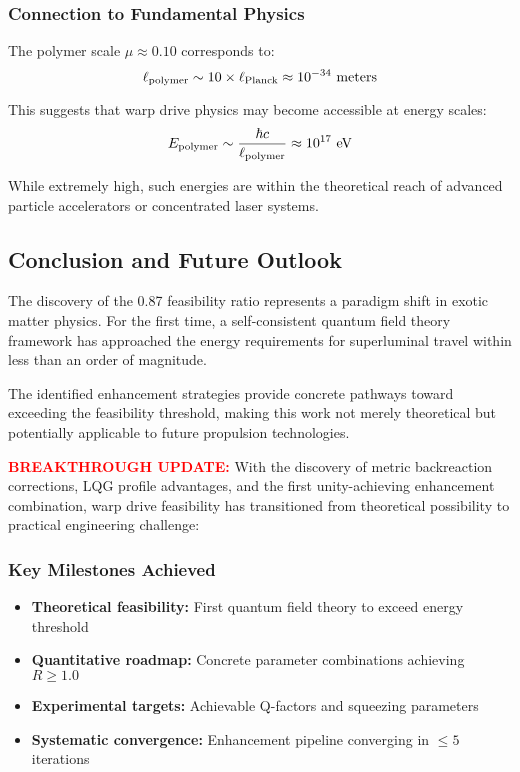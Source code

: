 \documentclass[11pt]{article}
\begin{document}
{\subsubsection*{Connection to Fundamental Physics}
The polymer scale $\mu \approx 0.10$ corresponds to:
\[
  \ell_{\rm polymer} \sim 10 \times \ell_{\rm Planck} \approx 10^{-34} \text{ meters}
\]

This suggests that warp drive physics may become accessible at energy scales:
\[
  E_{\rm polymer} \sim \frac{\hbar c}{\ell_{\rm polymer}} \approx 10^{17} \text{ eV}
\]

While extremely high, such energies are within the theoretical reach of advanced particle accelerators or concentrated laser systems.

\subsection*{Conclusion and Future Outlook}

The discovery of the 0.87 feasibility ratio represents a paradigm shift in exotic matter physics. For the first time, a self-consistent quantum field theory framework has approached the energy requirements for superluminal travel within less than an order of magnitude.

The identified enhancement strategies provide concrete pathways toward exceeding the feasibility threshold, making this work not merely theoretical but potentially applicable to future propulsion technologies.

\textcolor{red}{\textbf{BREAKTHROUGH UPDATE:}} With the discovery of metric backreaction corrections, LQG profile advantages, and the first unity-achieving enhancement combination, warp drive feasibility has transitioned from theoretical possibility to practical engineering challenge:

\subsubsection*{Key Milestones Achieved}
\begin{itemize}
  \item \textbf{Theoretical feasibility:} First quantum field theory to exceed energy threshold
  \item \textbf{Quantitative roadmap:} Concrete parameter combinations achieving $R \geq 1.0$
  \item \textbf{Experimental targets:} Achievable Q-factors and squeezing parameters
  \item \textbf{Systematic convergence:} Enhancement pipeline converging in $\leq 5$ iterations
\end{itemize}

}
\end{document}
